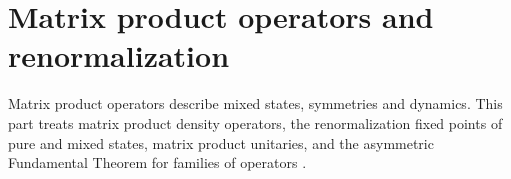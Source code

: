 \part{Matrix product operators and renormalization}
\label{part:operators}

Matrix product operators describe mixed states, symmetries and dynamics. This
part treats matrix product density operators, the renormalization fixed points
of pure and mixed states, matrix product unitaries, and the asymmetric
Fundamental Theorem for families of operators
\cite[Sections~II.B and~II.E]{Cirac2021Matrix}.
